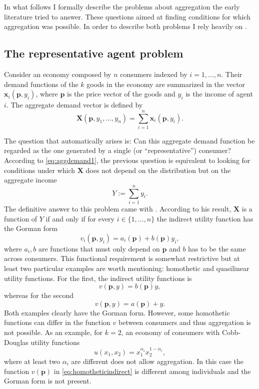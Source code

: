 \documentclass[english, a4paper, 12pt]{article}
\begin{document}
In what follows I formally describe the problems about aggregation the early literature tried to answer. These questions aimed at finding conditions for which aggregation was possible. In order to describe both problems I rely heavily on \cite{VarianBook}.

\subsection{The representative agent problem} \label{ssec:RepAgent}
Consider an economy composed by $n$ consumers indexed by $i = 1, \ldots, n$. Their demand functions of the $k$ goods in the economy are summarized in the vector $\mathbf{x}_{i}(\mathbf{p}, y_{i})$, where $\mathbf{p}$ is the price vector of the goods and $y_{i}$ is the income of agent $i$. The aggregate demand vector is defined by
	\begin{equation} \label{eq:aggdemand1}
		\mathbf{X}(\mathbf{p}, y_{1}, \ldots, y_{n}) = \sum_{i=1}^{n} \mathbf{x}_{i}(\mathbf{p},y_{i}).
	\end{equation}

The question that automatically arises is: Can this aggregate demand function be regarded as the one generated by a single (or ``representative'') consumer? According to \eqref{eq:aggdemand1}, the previous question is equivalent to looking for conditions under which $\mathbf{X}$ does not depend on the distribution but on the aggregate income
	$$Y := \sum_{i=1}^{n} y_{i}.$$
The definitive answer to this problem came with \cite{Gorman53}. According to his result, $\mathbf{X}$ is a function of $Y$ if and only if for every $i \in \{1,\ldots,n\}$ the indirect utility function has the Gorman form
	$$v_{i}(\mathbf{p}, y_{i}) = a_{i}(\mathbf{p}) + b(\mathbf{p})y_{i},$$ 
where $a_{i}, b$ are functions that must only depend on $\mathbf{p}$ and $b$ has to be the same across consumers. This functional requirement is somewhat restrictive but at least two particular examples are worth mentioning: homothetic and quasilinear utility functions. For the first, the indirect utility functions is
	\begin{equation} \label{eq:homotheticindirect}
		v(\mathbf{p}, y) = b(\mathbf{p})y,
	\end{equation}
whereas for the second
	$$v(\mathbf{p}, y) = a(\mathbf{p}) + y.$$
Both examples clearly have the Gorman form. However, some homothetic functions can differ in the function $v$ between consumers and thus aggregation is not possible. As an example, for $k = 2$, an economy of consumers with Cobb-Douglas utility functions
	$$u(x_{1}, x_{2}) = x_{1}^{\alpha_{i}}x_{2}^{1-\alpha_{i}},$$
where at least two $\alpha_{i}$ are different does not allow aggregation. In this case the function $v(\mathbf{p})$ in \eqref{eq:homotheticindirect} is different among individuals and the Gorman form is not present.
\end{document}
